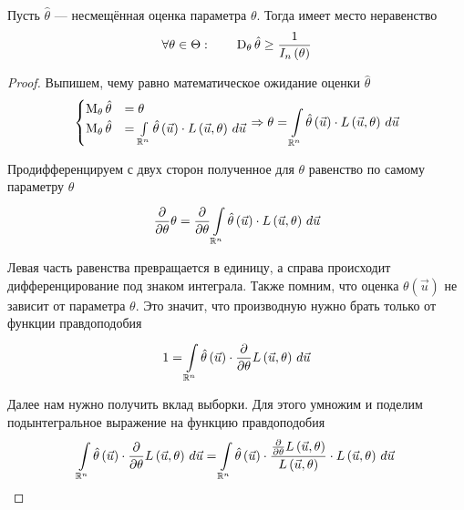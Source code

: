 \begin{theorem}
  \label{theorem:Rao-Kramer}
  Пусть $\hat{\theta}$ --- несмещённая оценка параметра $\theta$.
  Тогда имеет место неравенство
  \begin{equation*}
    \forall\theta\in\Theta:\qquad
    \dispersionof{\theta}{\hat{\theta}}
    \ge\frac{1}{I_n\left(\theta\right)}
  \end{equation*}
\end{theorem}
\begin{proof}
  Выпишем, чему равно математическое ожидание оценки $\hat{\theta}$
  $$\begin{cases}
    \meanof{\theta}{\hat{\theta}}
      &=\theta\\
    \meanof{\theta}{\hat{\theta}}
      &=\integral{\mathbb{R}^n}{}{\vec{u}}{
        \hat{\theta}\left( \vec{u} \right)
          \cdot L\left( \vec{u},\theta \right)}
    \end{cases}
    \Rightarrow
    \theta=\integral{\mathbb{R}^n}{}{\vec{u}}{
        \hat{\theta}\left( \vec{u} \right)
          \cdot L\left( \vec{u},\theta \right)}$$

  Продифференцируем с двух сторон полученное для $\theta$ равенство
  по самому параметру $\theta$
  $$\frac{\partial}{\partial \theta}\theta
    = \frac{\partial}{\partial \theta}\integral{\mathbb{R}^n}{}{\vec{u}}{
        \hat{\theta}\left( \vec{u} \right)
          \cdot L\left( \vec{u},\theta \right)}$$

  Левая часть равенства превращается в единицу,
  а справа происходит дифференцирование под знаком интеграла.
  Также помним, что оценка $\theta\left( \vec{u} \right)$
  не зависит от параметра $\theta$.
  Это значит, что производную нужно брать только от функции правдоподобия
  $$1 = \integral{\mathbb{R}^n}{}{\vec{u}}{\hat{\theta}\left( \vec{u} \right)
    \cdot \frac{\partial}{\partial \theta}L\left( \vec{u},\theta \right)}$$

  Далее нам нужно получить вклад выборки.
  Для этого умножим и поделим подынтегральное выражение
  на функцию правдоподобия
  $$\integral{\mathbb{R}^n}{}{\vec{u}}{\hat{\theta}\left( \vec{u} \right)
    \cdot \frac{\partial}{\partial \theta}L\left( \vec{u},\theta \right)}
  = \integral{\mathbb{R}^n}{}{\vec{u}}{\hat{\theta}\left( \vec{u} \right)
    \cdot \frac{
      \frac{\partial}{\partial \theta}L\left( \vec{u},\theta \right)}
      {L\left( \vec{u},\theta \right)}
        \cdot L\left( \vec{u},\theta \right)}$$


\end{proof}
